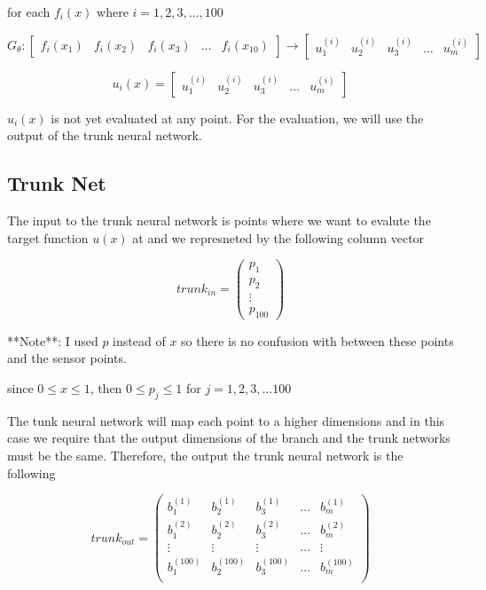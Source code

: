 \documentclass[a4paper, onecolumn, 12pt]{article}
\begin{document}
for each $f_i(x)$ where $i=1, 2, 3, \dots, 100$


$$
G_{\theta}:
\begin{bmatrix}
f_i(x_1) & f_i(x_2) & f_i(x_3) & \dots & f_i(x_{10})
\end{bmatrix}
\rightarrow
\begin{bmatrix}
u^{(i)}_1 & u^{(i)}_2 & u^{(i)}_3 & \dots & u^{(i)}_m
\end{bmatrix}
$$


$$
u_i(x) =
\begin{bmatrix}
u^{(i)}_1 & u^{(i)}_2 & u^{(i)}_3 & \dots & u^{(i)}_m
\end{bmatrix}
$$


$u_i(x)$ is not yet evaluated at any point. 
For the evaluation, we will use the output of the trunk neural network.


\subsection*{Trunk Net}
The input to the trunk neural network is points where we want to evalute the target function $u(x)$ at and we represneted by the following column vector

$$
trunk_{in} =
\begin{pmatrix}
p_1 \\
p_2 \\
\vdots \\
p_{100}
\end{pmatrix}
$$

**Note**: I used $p$ instead of $x$ so there is no confusion with between these points and the sensor points.

since $0 \le x \le 1$, then $0 \le p_j \le 1$ for $j=1, 2, 3, \dots 100$

The tunk neural network will map each point to a higher dimensions and in this case we require that the output dimensions of the branch and the trunk networks must be the same. Therefore, the output the trunk neural network is the following


$$
trunk_{out} = \begin{pmatrix}
b^{(1)}_1 & b^{(1)}_2 & b^{(1)}_3 & \dots & b^{(1)}_m\\
b^{(2)}_1 & b^{(2)}_2 & b^{(2)}_3 & \dots & b^{(2)}_m\\
\vdots & \vdots & \vdots & \dots & \vdots \\
b^{(100)}_1 & b^{(100)}_2 & b^{(100)}_3 & \dots & b^{(100)}_m\\
\end{pmatrix}
$$
\end{document}

